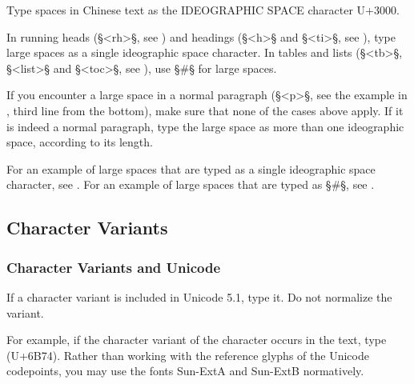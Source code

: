 \documentclass[fontsize=11pt, paper=a4, 
DIV15,
headings=normal,
parskip=half-, 
numbers=noenddot]{scrartcl}
\newcommand{\chin}[1]{{\fontspec{Sun-ExtA}{#1}}}
\newcommand{\z}[1]{\chin{#1}} %
\begin{document}
\begin{mainrule}
Type spaces in Chinese text as the IDEOGRAPHIC SPACE character U+3000.
\end{mainrule}

\begin{clarification}
In running heads (§<rh>§, see ) and headings (§<h>§ and §<ti>§, see ), type large spaces as a single ideographic space character.
In tables and lists (§<tb>§, §<list>§ and §<toc>§, see ), use §#§ for large spaces.
\end{clarification}

\begin{clarification}
If you encounter a large space in a normal paragraph (§<p>§, see the example in , third line from the bottom), make sure that none of the cases above apply. If it is indeed a normal paragraph, type the large space as more than one ideographic space, according to its length. 
\end{clarification}

\begin{crossref}
For an example of large spaces that are typed as a single ideographic space character, see . For an example of large spaces that are typed as §#§, see .
\end{crossref}


\tocspace
\subsection{Character Variants}
\label{section character variants}


\subsubsection{Character Variants and Unicode}
\label{section character variants and unicode}

\begin{mainrule}
If a character variant is included in Unicode 5.1, type it. Do not normalize the variant.
\end{mainrule}

\begin{clarification}
For example, if the character variant \z{歴} of the character \z{歷} occurs in the text, type \z{歴} (U+6B74).
%
Rather than working with the reference glyphs of the Unicode codepoints, you may use the fonts Sun-ExtA and Sun-ExtB normatively.
\end{clarification}
\end{document}
